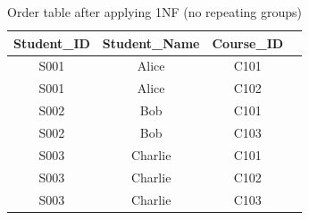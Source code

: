 \begin{table}[h!]
\centering
\caption{Order table after applying 1NF (no repeating groups)}
\label{tab:order_after_1nf}
\begin{tabular}{|c|c|c|c|}
\hline
\textbf{Student\_ID} & \textbf{Student\_Name} & \textbf{Course\_ID} \\
\hline
S001 & Alice & C101 \\
S001 & Alice & C102 \\
\hline
S002 & Bob & C101 \\
S002 & Bob & C103 \\
\hline
S003 & Charlie & C101 \\
S003 & Charlie & C102 \\
S003 & Charlie & C103\\
\hline
\end{tabular}
\end{table}
